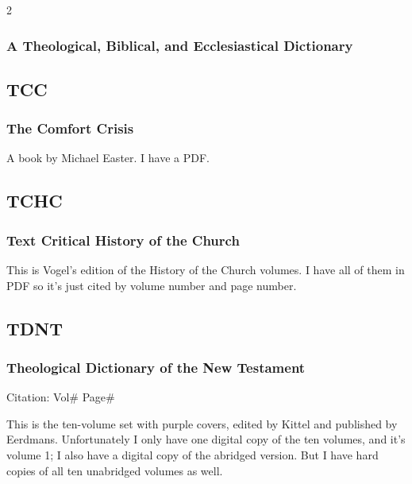 \begin{multicols}{2}
		\subsubsection*{A Theological, Biblical, and Ecclesiastical Dictionary}
		
			\phantom{.}
			
	\subsection*{TCC}
	
		\subsubsection*{The Comfort Crisis}
		
			A book by Michael Easter. I have a PDF.
			
	\subsection*{TCHC}
	
		\subsubsection*{Text Critical History of the Church}
		
			This is Vogel's edition of the History of the Church volumes. I have all of them in PDF so it's just cited by volume number and page number.
	
	\subsection*{TDNT}
	
		\subsubsection*{Theological Dictionary of the New Testament}
		
			Citation:
				Vol\# Page\#
		
			This is the ten-volume set with purple covers, edited by Kittel and published by Eerdmans. Unfortunately I only have one digital copy of the ten volumes, and it's volume 1; I also have a digital copy of the abridged version. But I have hard copies of all ten unabridged volumes as well.
		

\end{multicols}

